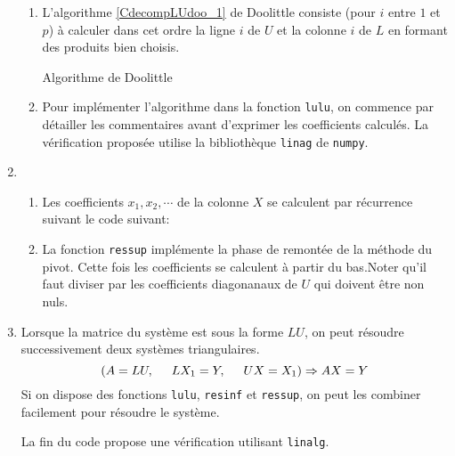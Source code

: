 \begin{enumerate}
\begin{enumerate}
  \item L'algorithme \ref{CdecompLUdoo_1} de Doolittle consiste (pour $i$ entre $1$ et $p$) à calculer dans cet ordre la ligne $i$ de $U$ et la colonne $i$ de $L$ en formant des produits bien choisis.
\begin{algorithm}
  \caption{Algorithme de Doolittle}
  \label{CdecompLUdoo_1}
\end{algorithm}

  \item Pour implémenter l'algorithme dans la fonction \texttt{lulu}, on commence par détailler les commentaires avant d'exprimer les coefficients calculés. La vérification proposée utilise la bibliothèque \texttt{linag} de \texttt{numpy}. 

\end{enumerate}

  \item
\begin{enumerate}
  \item Les coefficients $x_1,x_2,\cdots$ de la colonne $X$ se calculent par récurrence suivant le code suivant:


  \item La fonction \texttt{ressup} implémente la phase de remontée de la méthode du pivot. Cette fois les coefficients se calculent à partir du bas.\newline Noter qu'il faut diviser par les coefficients diagonanaux de $U$ qui doivent être non nuls.

\end{enumerate}

\item Lorsque la matrice du système est sous la forme $LU$, on peut résoudre successivement deux systèmes triangulaires.
\begin{displaymath}
\left( A = LU, \hspace{0.5cm} LX_1 = Y, \hspace{0.5cm} UX = X_1 \right)  \Rightarrow AX = Y
\end{displaymath}
Si on dispose des fonctions \texttt{lulu}, \texttt{resinf} et \texttt{ressup}, on peut les combiner facilement pour résoudre le système.

La fin du code propose une vérification utilisant \texttt{linalg}.
\end{enumerate}
